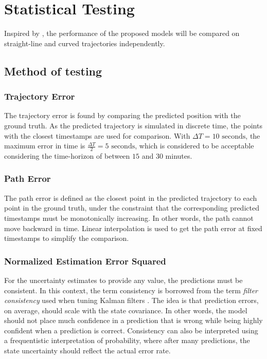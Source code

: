 \chapter{Statistical Testing}\label{chap:stat_testing}
Inspired by \cite{hexeberg}, the performance of the proposed models will be compared on straight-line and curved trajectories independently.

\section{Method of testing}
\subsection{Trajectory Error}
The trajectory error is found by comparing the predicted position with the ground truth. As the predicted trajectory is simulated in discrete time, the points with the closest timestamps are used for comparison. With $\Delta T = 10\text{ seconds}$, the maximum error in time is $\frac{\Delta T}{2} = 5 \text{ seconds}$, which is considered to be acceptable considering the time-horizon of between $15$ and $30$ minutes.
\subsection{Path Error}
The path error is defined as the closest point in the predicted trajectory to each point in the ground truth, under the constraint that the corresponding predicted timestamps must be monotonically increasing. In other words, the path cannot move backward in time. Linear interpolation is used to get the path error at fixed timestamps to simplify the comparison.

\subsection{Normalized Estimation Error Squared}
For the uncertainty estimates to provide any value, the predictions must be consistent. In this context, the term consistency is borrowed from the term \textit{filter consistency} used when tuning Kalman filters \cite{sensorfusjon}. The idea is that prediction errors, on average, should scale with the state covariance. In other words, the model should not place much confidence in a prediction that is wrong while being highly confident when a prediction is correct. Consistency can also be interpreted using a frequentistic interpretation of probability, where after many predictions, the state uncertainty should reflect the actual error rate.

